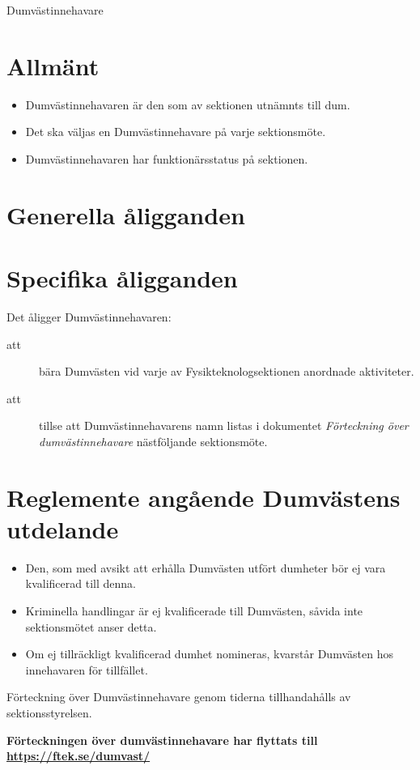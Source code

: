 \documentclass[a4paper]{article}
\begin{document}
\renewcommand{\forening}{Dumvästinnehavare} %

\begin{foreningenv}{\forening{}} %
    \section{Allmänt}
    \begin{itemize}
    \item Dumvästinnehavaren är den som av sektionen utnämnts till dum.
    \item Det ska väljas en Dumvästinnehavare på varje sektionsmöte.
    \item Dumvästinnehavaren har funktionärsstatus på sektionen.
    \end{itemize}
    
    \section{Generella åligganden}
    \aliggsektfunkt{}
    
    \section{Specifika åligganden}
    Det åligger Dumvästinnehavaren:
    \begin{description}
      \item[att] bära Dumvästen vid varje av Fysikteknologsektionen anordnade aktiviteter.
      \item[att] tillse att Dumvästinnehavarens namn listas i dokumentet \textit{Förteckning över dumvästinnehavare} nästföljande sektionsmöte.
    \end{description}
    
    \section{Reglemente angående Dumvästens utdelande}
    \begin{itemize}
      \item Den, som med avsikt att erhålla Dumvästen utfört dumheter
      bör ej vara kvalificerad till denna.
      \item Kriminella handlingar är ej kvalificerade till Dumvästen,
      såvida inte sektionsmötet anser detta.
      \item Om ej tillräckligt kvalificerad dumhet nomineras, kvarstår Dumvästen hos innehavaren för tillfället.
    \end{itemize}
    
    Förteckning över Dumvästinnehavare genom tiderna tillhandahålls av sektionsstyrelsen.
    
    \vspace{3em}
    
    \textbf{Förteckningen över dumvästinnehavare har flyttats till \href{https://ftek.se/dumvast/}{https://ftek.se/dumvast/}} %
\end{foreningenv}
\end{document}
